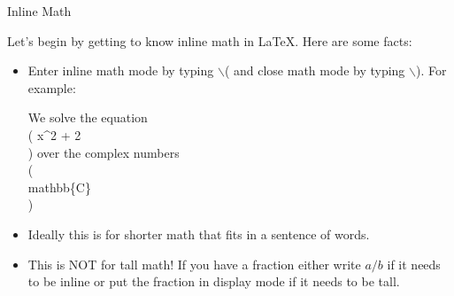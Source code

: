 \documentclass{beamer}
\begin{document}
\begin{frame}
{\begin{block}{Inline Math}
{Let's begin by getting to know inline math in \LaTeX. Here are some facts:
\begin{itemize}
	\item Enter inline math mode by typing $\backslash$( and close math mode by typing $\backslash$). For example:
	\begin{semiverbatim}
	We solve the equation \\( x\string^2 + 2\\) over the complex numbers \\(\\mathbb\{C\}\\)
	\end{semiverbatim}
	\item Ideally this is for shorter math that fits in a sentence of words.
	\item This is NOT for tall math! If you have a fraction either write $a/b$ if it needs to be inline or put the fraction in display mode if it needs to be tall.
\end{itemize}
}
\end{block}
}
\end{frame}
\end{document}
